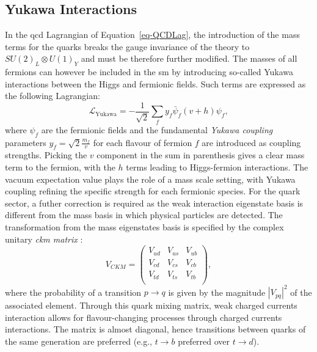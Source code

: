 \subsection{Yukawa Interactions}\label{subset-yukint}
In the \gls{qcd} Lagrangian of Equation~\ref{eq-QCDLag}, the introduction of the mass terms for the quarks breaks the gauge invariance of the theory to $SU(2)_L \otimes U(1)_Y$ and must be therefore further modified. The masses of all fermions can however be included in the \gls{sm} by introducing so-called Yukawa interactions between the Higgs and fermionic fields. Such terms are expressed as the following Lagrangian:
\begin{equation}\label{eq-YukLag}
    \mathcal{L}_{\text{Yukawa}} = - \frac{1}{\sqrt{2}} \sum_{f} 
    y_f \bar{\psi}_f (v + h) \psi_f,
\end{equation}
where $\psi_f$ are the fermionic fields and the fundamental \textit{Yukawa coupling} parameters $y_f = \sqrt{2} \frac{m_f}{v}$ for each flavour of fermion $f$ are introduced as coupling strengths. Picking the $v$ component in the sum in parenthesis gives a clear mass term to the fermion, with the $h$ terms leading to Higgs-fermion interactions. The vacuum expectation value plays the role of a mass scale setting, with Yukawa coupling refining the specific strength for each fermionic species. For the quark sector, a futher correction is required as the weak interaction eigenstate basis is different from the mass basis in which physical particles are detected. The transformation from the mass eigenstates basis is specified by the complex unitary \textit{\gls{ckm} matrix} \cite{Tanabashi:2018oca}:
\begin{equation}
    V_{CKM} = \begin{pmatrix}
            V_{ud} & V_{us} & V_{ub}\\ 
            V_{cd} & V_{cs} & V_{cb}\\ 
            V_{td} & V_{ts} & V_{tb}\\ 
        \end{pmatrix},
\end{equation}
where the probability of a transition $p \rightarrow q$ is given by the magnitude $|V_{pq}|^2$ of the associated element. Through this quark mixing matrix, weak charged currents interaction allows for flavour-changing processes through charged currents interactions. The matrix is almost diagonal, hence transitions between quarks of the same generation are preferred (e.g., $t \rightarrow b$ preferred over $t \rightarrow d$).

